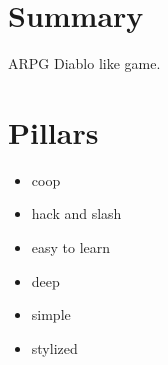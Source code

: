 \documentclass{article}
\begin{document}
\setlength{\voffset}{-0.75in}
\setlength{\headsep}{5pt}




\section*{Summary}
ARPG Diablo like game.
\section*{Pillars}
\begin{itemize}
  \item coop
  \item hack and slash
  \item easy to learn
  \item deep
  \item simple
  \item stylized
\end{itemize}
\end{document}
